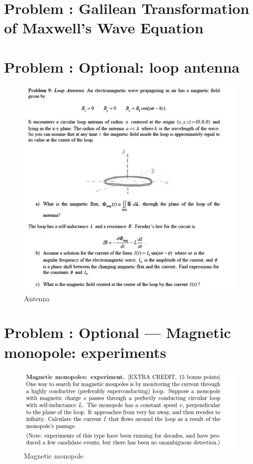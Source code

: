 \documentclass[problems]{esg8022pset}
\begin{document}
\section{Problem \thesection: Galilean Transformation of Maxwell's Wave Equation}
\section{Problem \thesection: Optional: loop antenna}
\begin{figure}[H]
    \centering
    \includegraphics[width = 15cm]{loopantenna}
    \caption{Antenna}
  \end{figure}
\section{Problem \thesection: Optional --- Magnetic monopole: experiments}

 \begin{figure}[H]
    \centering
    \includegraphics[width = 15cm]{monopoles}
    \caption{Magnetic monopole}
  \end{figure}
\end{document}
